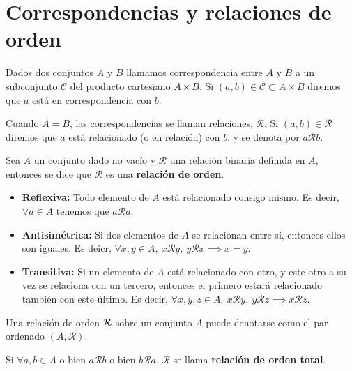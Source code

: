 {\section{Correspondencias y relaciones de orden}
\begin{defi}
    Dados dos conjuntos $A$ y $B$ llamamos correspondencia entre $A$ y $B$ a un subconjunto $\mathcal{C}$ del producto cartesiano $A\times B$. Si $\left( a, b \right) \in\mathcal{C}\subset A\times B$ diremos que $a$ está en correspondencia con $b$.
\end{defi}

\begin{defi}
    Cuando $A = B$, las correspondencias se llaman relaciones, $\mathcal{R}$. Si $\left( a, b \right)\in\mathcal{R} $ diremos que $a$ está relacionado (o en relación) con $b$, y se denota por $a\mathcal{R}b$.
\end{defi}

\begin{defi}
    Sea $A$ un conjunto dado no vacío y $\mathcal{R}$ una relación binaria definida en $A$, entonces se dice que $\mathcal{R}$ es una \textbf{relación de orden}.
    \begin{itemize}[itemsep = -2pt]
        \item\textbf{Reflexiva:} Todo elemento de $A$ está relacionado consigo mismo. Es decir, $\forall a\in A$ tenemos que $a\mathcal{R} a$.
        \item\textbf{Antisimétrica:} Si dos elementos de $A$ se relacionan entre sí, entonces ellos son iguales. Es deicr, $\forall x, y\in A,\ x\mathcal{R} y,\ y\mathcal{R} x \implies x = y$.
        \item\textbf{Transitiva:} Si un elemento de $A$ está relacionado con otro, y este otro a su vez se relaciona con un tercero, entonces el primero estará relacionado también con este último. Es decir, $\forall x, y, z\in A,\ x\mathcal{R} y,\ y\mathcal{R}z\implies x\mathcal{R}z$.
    \end{itemize}
\end{defi}

\begin{notation}
    Una relación de orden $\mathcal{R}$ sobre un conjunto $A$ puede denotarse como el par ordenado $\left( A, \mathcal{R} \right) $.
\end{notation}

\begin{defi}
    Si $\forall a, b\in A$ o bien $a\mathcal{R} b$ o bien $b\mathcal{R} a$, $\mathcal{R}$ se llama \textbf{relación de orden total}.
\end{defi}

}
